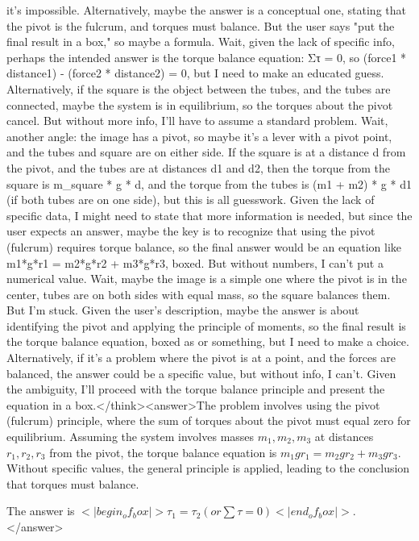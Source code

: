it's impossible. Alternatively, maybe the answer is a conceptual one, stating that the pivot is the fulcrum, and torques must balance. But the user says "put the final result in a box," so maybe a formula. Wait, given the lack of specific info, perhaps the intended answer is the torque balance equation: Στ = 0, so (force1 * distance1) - (force2 * distance2) = 0, but I need to make an educated guess. Alternatively, if the square is the object between the tubes, and the tubes are connected, maybe the system is in equilibrium, so the torques about the pivot cancel. But without more info, I'll have to assume a standard problem. Wait, another angle: the image has a pivot, so maybe it's a lever with a pivot point, and the tubes and square are on either side. If the square is at a distance d from the pivot, and the tubes are at distances d1 and d2, then the torque from the square is m_square * g * d, and the torque from the tubes is (m1 + m2) * g * d1 (if both tubes are on one side), but this is all guesswork. Given the lack of specific data, I might need to state that more information is needed, but since the user expects an answer, maybe the key is to recognize that using the pivot (fulcrum) requires torque balance, so the final answer would be an equation like m1*g*r1 = m2*g*r2 + m3*g*r3, boxed. But without numbers, I can't put a numerical value. Wait, maybe the image is a simple one where the pivot is in the center, tubes are on both sides with equal mass, so the square balances them. But I'm stuck. Given the user's description, maybe the answer is about identifying the pivot and applying the principle of moments, so the final result is the torque balance equation, boxed as  or something, but I need to make a choice. Alternatively, if it's a problem where the pivot is at a point, and the forces are balanced, the answer could be a specific value, but without info, I can't. Given the ambiguity, I'll proceed with the torque balance principle and present the equation in a box.</think><answer>The problem involves using the pivot (fulcrum) principle, where the sum of torques about the pivot must equal zero for equilibrium. Assuming the system involves masses \( m_1, m_2, m_3 \) at distances \( r_1, r_2, r_3 \) from the pivot, the torque balance equation is \( m_1 g r_1 = m_2 g r_2 + m_3 g r_3 \). Without specific values, the general principle is applied, leading to the conclusion that torques must balance.  

The answer is \(<|begin_of_box|>\tau_1 = \tau_2 (or \sum \tau = 0)<|end_of_box|>\).</answer>